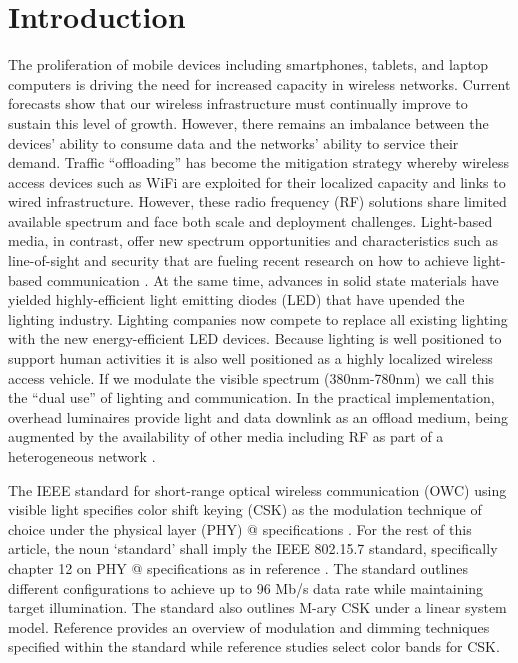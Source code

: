\documentclass[10pt,letterpaper]{article}
\makeatletter
\newcommand*{\rmnum}[1]{\expandafter\@slowromancap\romannumeral #1@}
\makeatother
\begin{document}
\section{Introduction}\label{sINTR}

The proliferation of mobile devices including smartphones, tablets,
and laptop computers is driving the need for increased capacity in
wireless networks. Current forecasts \cite{cis14a} show that our
wireless infrastructure must continually improve to sustain this level
of growth. However, there remains an imbalance between the devices'
ability to consume data and the networks' ability to service their
demand. Traffic ``offloading'' has become the mitigation strategy
whereby wireless access devices such as WiFi are exploited for their
localized capacity and links to wired infrastructure. However, these
radio frequency (RF) solutions share limited available spectrum and face both scale and
deployment challenges.  Light-based media, in contrast, offer new
spectrum opportunities and characteristics such as line-of-sight and
security that are fueling recent research on how to achieve
light-based communication \cite{elg11a}.  At the same time, advances in solid state
materials have yielded highly-efficient light emitting diodes (LED) that have upended the lighting industry.  Lighting companies now compete to replace all
existing lighting with the new energy-efficient LED devices. Because
lighting is well positioned to support human activities it is also
well positioned as a highly localized wireless access vehicle. If we
modulate the visible spectrum (380nm-780nm) we call this the ``dual
use'' of lighting and communication.  In the practical implementation,
overhead luminaires provide light and data downlink as an offload
medium, being augmented by the availability of other media including
RF as part of a heterogeneous network \cite{gan13a,rah15a}. 

The IEEE standard for short-range optical wireless communication (OWC) using
visible light specifies color shift keying (CSK)
as the modulation technique of choice under the physical layer (PHY)
\rmnum{3} specifications \cite{ieee802.15.7}. For the rest of this article, the noun `standard' shall imply the IEEE 802.15.7 standard, specifically chapter 12 on PHY \rmnum{3} specifications as in reference \cite{ieee802.15.7}. The standard outlines different configurations to achieve up to 96 Mb/s data rate while
maintaining target illumination. The standard also outlines M-ary CSK under
a linear system model. Reference \cite{raj12a} provides an overview of
modulation and dimming techniques specified within the standard while
reference \cite{sin13a} studies select color bands for CSK.
\end{document}
